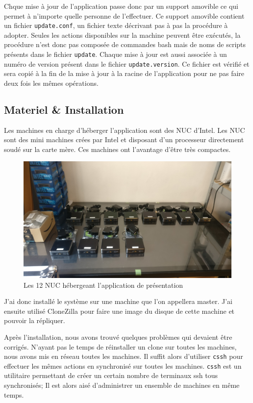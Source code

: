 \medskip

Chque mise à jour de l'application passe donc par un support amovible ce qui permet à n'importe quelle personne de l'effectuer.
Ce support amovible contient un fichier \texttt{update.conf}, un fichier texte décrivant pas à pas la procédure à adopter.
Seules les actions disponibles sur la machine peuvent être exécutés, la procédure n'est donc pas composée de commandes bash mais de noms de scripts présents dans le fichier \texttt{update}.
Chaque mise à jour est aussi associée à un numéro de version présent dans le fichier \texttt{update.version}.
Ce fichier est vérifié et sera copié à la fin de la mise à jour à la racine de l'application pour ne pas faire deux fois les mêmes opérations.

\subsection{Materiel \& Installation}

Les machines en charge d'héberger l'application sont des NUC d'Intel.
Les NUC sont des mini machines crées par Intel et disposant d'un processeur directement soudé sur la carte mère.
Ces machines ont l'avantage d'être très compactes.

\begin{figure}[h]
    \centering
    \includegraphics[scale=0.4]{img/somfy-nuc.jpg}
    \caption{Les 12 NUC hébergeant l'application de présentation}
\end{figure}

J'ai donc installé le système sur une machine que l'on appellera master.
J'ai ensuite utilisé CloneZilla pour faire une image du disque de cette machine et pouvoir la répliquer.

Après l'installation, nous avons trouvé quelques problèmes qui devaient être corrigés.
N'ayant pas le temps de réinstaller un clone sur toutes les machines, nous avons mis en réseau toutes les machines.
Il suffit alors d'utiliser \texttt{cssh} pour effectuer les mêmes actions en synchronisé sur toutes les machines.
\texttt{cssh} est un utilitaire permettant de créer un certain nombre de terminaux ssh tous synchronisés;
Il est alors aisé d'administrer un ensemble de machines en même temps.

